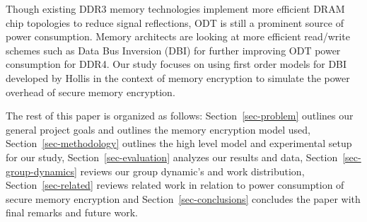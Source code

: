 Though existing DDR3 memory technologies implement more efficient DRAM chip
topologies to reduce signal reflections, ODT is still a prominent source of
power consumption. Memory architects are looking at more efficient read/write
schemes such as Data Bus Inversion (DBI) for further improving ODT power
consumption for DDR4. Our study focuses on using first order models for DBI
developed by Hollis \cite{hollis} in the context of memory encryption to
simulate the power overhead of secure memory encryption. 

The rest of this paper is organized as follows: Section~\ref{sec-problem}
outlines our general project goals and outlines the memory encryption model
used, Section~\ref{sec-methodology} outlines the high level model and
experimental setup for our study, Section~\ref{sec-evaluation} analyzes our
results and data, Section~\ref{sec-group-dynamics} reviews our group dynamic's
and work distribution, Section~\ref{sec-related} reviews related work in
relation to power consumption of secure memory encryption and
Section~\ref{sec-conclusions} concludes the paper with final remarks and future
work.
